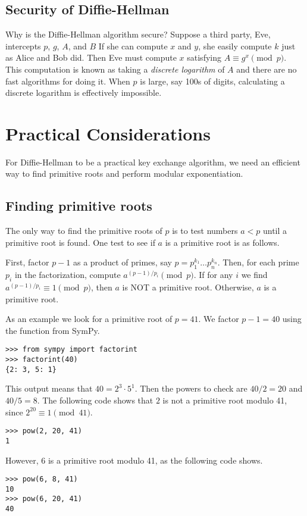 \subsection*{Security of Diffie-Hellman}
Why is the Diffie-Hellman algorithm secure? 
Suppose a third party, Eve, intercepts $p$, $g$, $A$, and $B$
If she can compute $x$ and $y$, she easily compute $k$ just as Alice and Bob did. 
Then Eve must compute $x$ satisfying $A\equiv g^x \pmod{p}$.
This computation is known as taking a \emph{discrete logarithm} of $A$ and there are no fast algorithms for doing it.
When $p$ is large, say 100s of digits, calculating a discrete logarithm is effectively impossible.

\section*{Practical Considerations}
For Diffie-Hellman to be a practical key exchange algorithm, we need an efficient way to find primitive roots and perform modular exponentiation.

\subsection*{Finding primitive roots}
The only way to find the primitive roots of $p$ is to test numbers $a<p$ until a primitive root is found.
One test to see if $a$ is a primitive root is as follows.

First, factor $p-1$ as a product of primes, say $p=p_1^{k_1}\ldots p_n^{k_n}$.
Then, for each prime $p_i$ in the factorization, compute $a^{(p-1)/p_i} \pmod{p}$.
If for any $i$ we find $a^{(p-1)/p_i}\equiv 1 \pmod{p}$, then $a$ is NOT a primitive root.
Otherwise, $a$ is a primitive root.

As an example we look for a primitive root of $p=41$.
We factor $p-1=40$ using the function  from SymPy.
\begin{lstlisting}
>>> from sympy import factorint
>>> factorint(40)
{2: 3, 5: 1}
\end{lstlisting}
This output means that $40=2^3\cdot5^1$.
Then the powers to check are $40/2=20$ and $40/5=8$.
The following code shows that $2$ is not a primitive root modulo 41, since $2^{20}\equiv 1 \pmod{41}$.
\begin{lstlisting}
>>> pow(2, 20, 41)
1
\end{lstlisting}
However, 6 is a primitive root modulo 41, as the following code shows.
\begin{lstlisting}
>>> pow(6, 8, 41)
10
>>> pow(6, 20, 41)
40
\end{lstlisting}

